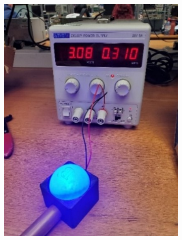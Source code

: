 \begin{figure}
    \begin{subfigure}[b]{.3\linewidth}
        \includegraphics[width=\linewidth]{images/led-blue.jpg}
    \end{subfigure}
    \begin{subfigure}[b]{.3\linewidth}

\end{subfigure}
\end{figure}
